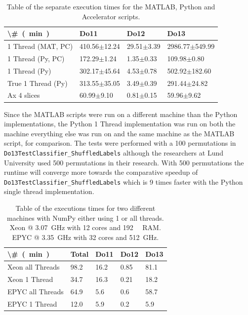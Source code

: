 \documentclass[12pt, a4paper]{article}
\begin{document}
\begin{table}[H]
\centering
    \begin{tabular}{|l|l|l|l|}
    \hline
    \SI[parse-numbers=false]{\#}{(\minute)}    & Do11             & Do12           & Do13               \\ \hline
    1 Thread (MAT, PC) & 410.56$\pm$12.24 & 29.51$\pm$3.39 & 2986.77$\pm$549.99 \\ \hline
    1 Thread (Py, PC)  & 172.29$\pm$1.24  & 1.35$\pm$0.33  & 109.98$\pm$0.80    \\ \hline
    1 Thread (Py)      & 302.17$\pm$45.64 & 4.53$\pm$0.78  & 502.92$\pm$182.60  \\ \hline
    True 1 Thread (Py) & 313.55$\pm$35.05 & 3.49$\pm$0.39  & 291.44$\pm$24.82   \\ \hline
    Ax 4 slices        & 60.99$\pm$9.10   & 0.81$\pm$0.15  & 59.96$\pm$9.62     \\ \hline
    \end{tabular}
    
    \caption{Table of the separate execution times for the MATLAB, Python and Accelerator scripts.}
    \label{AppendixSeperateTimes}
\end{table}


Since the MATLAB scripts were run on a different machine than the Python implementations, the Python 1 Thread implementation was run on both the machine everything else was run on and the same machine as the MATLAB script, for comparison.
The tests were performed with a 100 permutations in \texttt{Do13TestClassifier\_ShuffledLabels} although the researchers at Lund University used 500 permutations in their research.
With 500 permutations the runtime will converge more towards the comparative speedup of \texttt{Do13TestClassifier\_ShuffledLabels} which is 9 times faster with the Python single thread implementation.

\begin{table}[H]
\centering
    \begin{tabular}{|l|l|l|l|l|}
    \hline
    \SI[parse-numbers=false]{\#}{(\minute)} & Total & Do11  & Do12  & Do13  \\ \hline
    Xeon all Threads                        & 98.2  & 16.2  & 0.85  & 81.1  \\ \hline
    Xeon 1 Thread                           & 34.7  & 16.3  & 0.21  & 18.2  \\ \hline
    EPYC all Threads                        & 64.9  & 5.6   & 0.6   & 58.7  \\ \hline
    EPYC 1 Thread                           & 12.0  & 5.9   & 0.2   & 5.9   \\ \hline
    \end{tabular}
    
    \caption{Table of the executions times for two different machines with NumPy either using 1 or all threads.
    Xeon @ \SI{3.07}{\giga\hertz} with 12 cores and \SI{192}{\giga\byte} RAM. EPYC @ \SI{3.35}{\giga\hertz} with 32 cores and \SI{512}{\giga\hertz}.}
    \label{Acc:NumPy1Thread}
\end{table}
\end{document}
